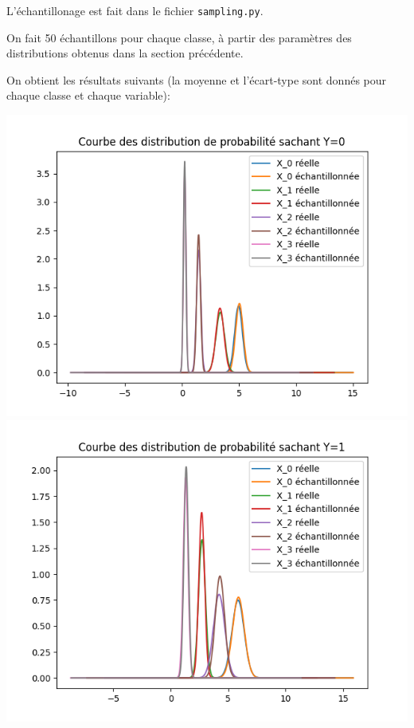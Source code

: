 \documentclass[
]{article}
\begin{document}
L'échantillonage est fait dans le fichier \texttt{sampling.py}.

On fait 50 échantillons pour chaque classe, à partir des paramètres des
distributions obtenus dans la section précédente.

On obtient les résultats suivants (la moyenne et l'écart-type sont
donnés pour chaque classe et chaque variable):

\includegraphics{../res/sample_compare_Y_0.png}
\includegraphics{../res/sample_compare_Y_1.png}
\end{document}
